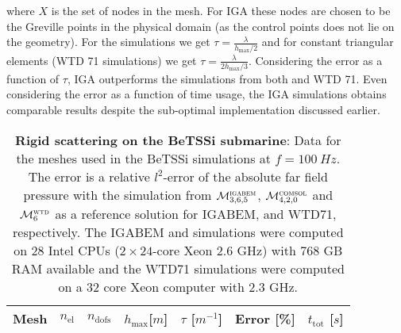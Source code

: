 where $X$ is the set of nodes in the mesh. For IGA these nodes are chosen to be the Greville points in the physical domain (as the control points does not lie on the geometry). For the \COMSOL simulations we get $\tau=\frac{\lambda}{h_{\mathrm{max}}/2}$ and for constant triangular elements (WTD 71 simulations) we get ${\tau=\frac{\lambda}{2h_{\mathrm{max}}/3}}$. Considering the error as a function of $\tau$, IGA outperforms the simulations from both \COMSOL and WTD 71. Even considering the error as a function of time usage, the IGA simulations obtains comparable results despite the sub-optimal implementation discussed earlier.
\begin{table}
	\centering
	\caption{\textbf{Rigid scattering on the BeTSSi submarine}: Data for the meshes used in the BeTSSi simulations at $f=\SI{100}{Hz}$. The error is a relative $l^2$-error of the absolute far field pressure with the simulation from ${\cal M}_{3,6,5}^{\textsc{igabem}}$, ${\cal M}_{4,2,0}^{\textsc{comsol}}$ and ${\cal M}_{6}^{\textsc{wtd}}$ as a reference solution for IGABEM, \COMSOL and WTD71, respectively. The IGABEM and \COMSOL simulations were computed on 28 Intel CPUs ($2\times 24$-core Xeon 2.6 GHz) with 768 GB RAM available and the WTD71 simulations were computed on a 32 core Xeon computer with 2.3 GHz.}
	\label{Tab3:BeTSSiComputationalData}
	\begin{tabular}{c S[table-format = 8.0] S[table-format = 8.0] S[table-format = 1.2,round-mode=places,round-precision=2] S[table-format = 3.1,round-mode=places,round-precision=1] S[table-format = 2.4,round-mode=places,round-precision=4] S[table-format = 6.0]}
		\toprule
		Mesh & {$n_{\mathrm{el}}$} & {$n_{\mathrm{dofs}}$} & {$h_{\mathrm{max}}$[$\si{m}$]}  & {$\tau$ [$\si{m^{-1}}$]}  & {Error [\%]}  & {$t_{\mathrm{tot}}$ [$\si{s}$]}\\
		\hline

\end{tabular}
\end{table}
